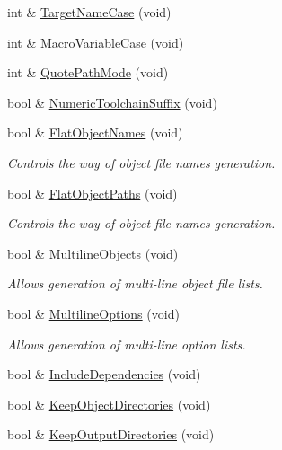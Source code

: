 \begin{DoxyCompactItemize}
int \& \hyperlink{classCCodeBlocksBuildConfig_a478b0e7a1078e2ed33bba779f492d985}{Target\-Name\-Case} (void)
\item 
int \& \hyperlink{classCCodeBlocksBuildConfig_ad7e8cb763dea92e8d9c9e2bc460a4f5a}{Macro\-Variable\-Case} (void)
\item 
int \& \hyperlink{classCCodeBlocksBuildConfig_afaecfed36bea423ccd1bc39b10e919bb}{Quote\-Path\-Mode} (void)
\item 
bool \& \hyperlink{classCCodeBlocksBuildConfig_a20ac91ad51a7c1f9b75251eaf698a1c4}{Numeric\-Toolchain\-Suffix} (void)
\item 
bool \& \hyperlink{classCCodeBlocksBuildConfig_a492ae94259ceb93383c3ac0063ff475e}{Flat\-Object\-Names} (void)
\begin{DoxyCompactList}\small\item\em Controls the way of object file names generation. \end{DoxyCompactList}\item 
bool \& \hyperlink{classCCodeBlocksBuildConfig_a3213079d916d210c1c83560230457854}{Flat\-Object\-Paths} (void)
\begin{DoxyCompactList}\small\item\em Controls the way of object file names generation. \end{DoxyCompactList}\item 
bool \& \hyperlink{classCCodeBlocksBuildConfig_a13d1d469d597c7724b6a1975bb00bdd5}{Multiline\-Objects} (void)
\begin{DoxyCompactList}\small\item\em Allows generation of multi-\/line object file lists. \end{DoxyCompactList}\item 
bool \& \hyperlink{classCCodeBlocksBuildConfig_adcc30cc5d53ceaf3251ce43c491dfde3}{Multiline\-Options} (void)
\begin{DoxyCompactList}\small\item\em Allows generation of multi-\/line option lists. \end{DoxyCompactList}\item 
bool \& \hyperlink{classCCodeBlocksBuildConfig_ae0831e3b1fd82d237ad62c4d56ecaab1}{Include\-Dependencies} (void)
\item 
bool \& \hyperlink{classCCodeBlocksBuildConfig_ac49779fefbf4487342d8dc4b611472b2}{Keep\-Object\-Directories} (void)
\item 
bool \& \hyperlink{classCCodeBlocksBuildConfig_a4f6a164fd09b1bc4e78510529919d13b}{Keep\-Output\-Directories} (void)

\end{DoxyCompactItemize}
